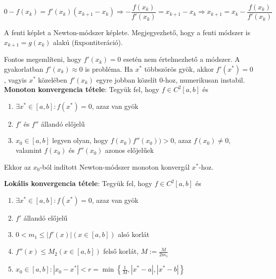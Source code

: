 \documentclass[margin=0px]{article}
\begin{document}
\begin{displaymath}
    0 - f(x_{k}) = f'(x_{k}) (x_{k+1}-x_{k}) \Rightarrow
    - \frac{f(x_{k})}{f'(x_{k})} = x_{k+1} - x_{k} \Rightarrow
    x_{k+1} = x_{k} - \frac{f(x_{k})}{f'(x_{k})}
\end{displaymath}

A fenti képlet a Newton-módszer képlete. Megjegyezhető, hogy a fenti módszer is $x_{k+1} = g(x_{k})$
alakú (fixpontiteráció).

Fontos megemlíteni, hogy $f'(x_{k}) = 0$ esetén nem értelmezhető a módszer. A gyakorlatban $f'(x_{k}) \approx 0$ is probléma.
Ha $x^{*}$ többszörös gyök, akkor $f'(x^{*}) = 0$, vagyis $x^{*}$ közelében $f'(x_{k})$ egyre jobban közelít $0$-hoz, numerikusan
instabil.\\

\noindent \textbf{Monoton konvergencia tétele}: Tegyük fel, hogy $f \in C^{2}[a,b]$ és
\begin{enumerate}
    \item	$\exists x^{*} \in [a,b] : f(x^{*}) = 0$, azaz van gyök

    \item	$f'$ és $f''$ állandó előjelű

    \item	$x_{0} \in [a,b]$ legyen olyan, hogy $f(x_{0}) f''(x_{0})) >0$, azaz $f(x_{0}) \not = 0$, valamint $f(x_{0})$ és $f''(x_{0})$
          azonos előjelűek
\end{enumerate}

\noindent Ekkor az $x_{0}$-ból indított Newton-módszer monoton konvergál $x^{*}$-hoz.

\noindent \textbf{Lokális konvergencia tétele}:	Tegyük fel, hogy $f \in C^{2}[a,b]$ és
\begin{enumerate}
    \item	$\exists x^{*} \in [a,b] : f(x^{*}) = 0$, azaz van gyök

    \item	$f'$ állandó előjelű

    \item	$0<m_{1} \leq |f'(x)| (x \in [a,b])$ alsó korlát

    \item	$f''(x) \leq M_{2} (x \in [a,b])$ felső korlát, $M:= \frac{M}{2m_{1}}$

    \item	$x_{0} \in [a,b]: |x_{0} - x^{*}| < r = \min \left\{\frac{1}{M}, |x^{*}-a|, |x^{*}-b|\right\}$
\end{enumerate}
\end{document}

